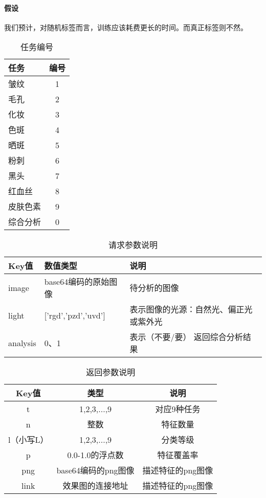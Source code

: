 \documentclass[UTF8]{ctexbook}
\begin{document}
\paragraph{假设}
我们预计，对随机标签而言，训练应该耗费更长的时间。而真正标签则不然。
\begin{table}[!htbp]
\centering
\begin{tabular}{l|c}
任务&编号\\
\hline
皱纹&1\\
毛孔&2\\
化妆&3\\
色斑&4\\
晒斑&5\\
粉刺&6\\
黑头&7\\
红血丝&8\\
皮肤色素&9\\
综合分析&0\\

\end{tabular}
\caption{任务编号}
\end{table}
\begin{table}[!htbp]
\centering
\begin{tabular}{l|l|l}

Key值&数值类型&说明\\
\hline
image&base64编码的原始图像&待分析的图像\\

light&['rgd','pzd','uvd']&表示图像的光源：自然光、偏正光或紫外光\\

analysis&0、1&表示（不要/要） 返回综合分析结果\\

\end{tabular}
\caption{请求参数说明}
\end{table}


\begin{table}[!htbp]
\centering
\begin{tabular}{c|c|c}

Key值&类型&说明\\
\hline
t & 1,2,3,...,9 & 对应9种任务\\
\hline
n & 整数 & 特征数量\\
\hline
l（小写L） & 1,2,3,...,9 & 分类等级\\
\hline
p & 0.0-1.0的浮点数 & 特征覆盖率\\
\hline
png & base64编码的png图像 & 描述特征的png图像\\
\hline
link & 效果图的连接地址 & 描述特征的png图像\\

\end{tabular}
\caption{返回参数说明}
\end{table}
\end{document}
